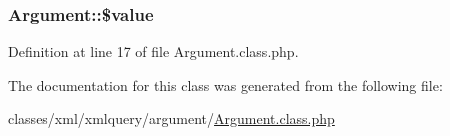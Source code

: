 \hypertarget{classArgument_a762eb8881d615f61189bba09b9bd7300}{
\subsubsection[{\$value}]{\setlength{\rightskip}{0pt plus 5cm}Argument\+::\$value}}\label{classArgument_a762eb8881d615f61189bba09b9bd7300}


Definition at line 17 of file Argument.\+class.\+php.



The documentation for this class was generated from the following file\+:\begin{DoxyCompactItemize}
\item 
classes/xml/xmlquery/argument/\hyperlink{Argument_8class_8php}{Argument.\+class.\+php}\end{DoxyCompactItemize}
